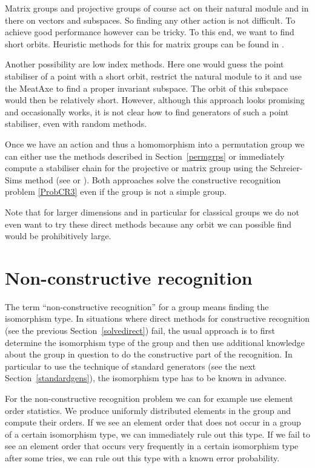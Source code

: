 Matrix groups and projective groups of course act on their natural
module and in there on vectors and subspaces. So finding any other
action is not difficult. To achieve good performance however can be
tricky. To this end, we want to find short orbits. Heuristic methods
for this for matrix groups can be found in \cite{shortorbits}.

Another possibility are low index methods.
Here one would guess the point stabiliser of a point with a short
orbit, restrict the natural module to it and use the MeatAxe to find a
proper invariant subspace. The orbit of this subspace would then be
relatively short. However, although this approach looks promising and
occasionally works, it is not clear how to find generators of such a
point stabiliser, even with random methods.

Once we have an action and thus a homomorphism into a permutation 
group we can either use the methods described in Section~\ref{permgrps}
or immediately compute a stabiliser chain for the projective or matrix
group using the Schreier-Sims method (see \cite{nearlylin} or
\cite{Ser}). Both approaches solve the constructive recognition
problem \ref{ProbCR3} even if the group is not a simple group.

Note that for larger dimensions and in particular for classical groups
we do not even want to try these direct methods because any orbit we
can possible find would be prohibitively large.


\section{Non-constructive recognition}
\label{nonconstructive}

The term ``non-constructive recognition'' for a group means finding
the isomorphism type. In situations where direct methods for constructive 
recognition (see the previous Section~\ref{solvedirect}) fail, the usual
approach is to first determine the isomorphism type of the group and
then use additional knowledge about the group in question to do the
constructive part of the recognition. In particular to use the
technique of standard generators (see the next
Section~\ref{standardgens}), the isomorphism type has to be known in
advance.

For the non-constructive recognition problem we can for example use
element order statistics. We produce uniformly distributed elements in
the group and compute their orders. If we see an element order that
does not occur in a group of a certain isomorphism type, we can
immediately rule out this type. If we fail to see an element order that
occurs very frequently in a certain isomorphism type after some tries,
we can rule out this type with a known error probability.

